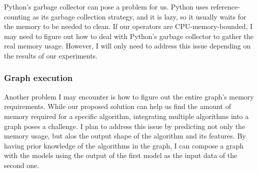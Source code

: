 Python's garbage collector can pose a problem for us.
Python uses reference-counting as its garbage collection strategy, and it is lazy, so it usually waits for the memory to be needed to clean.
If our operators are CPU-memory-bounded, I may need to figure out how to deal with Python's garbage collector to gather the real memory usage.
However, I will only need to address this issue depending on the results of our experiments.

\subsubsection{Graph execution}

Another problem I may encounter is how to figure out the entire graph's memory requirements.
While our proposed solution can help us find the amount of memory required for a specific algorithm, integrating multiple algorithms into a graph poses a challenge.
I plan to address this issue by predicting not only the memory usage, but alos the output shape of the algorithm and its features.
By having prior knowledge of the algorithms in the graph, I can compose a graph with the models using the output of the first model as the input data of the second one.
